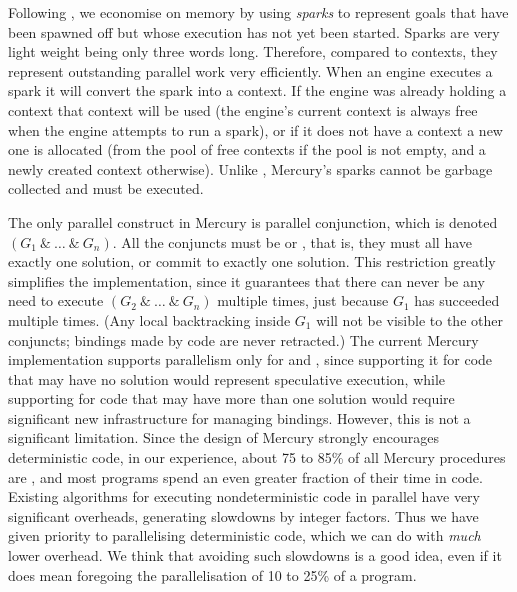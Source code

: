 Following \citet{simonmar_2009_multicore_rts},
we economise on memory by using \emph{sparks}
to represent goals that have been spawned off
but whose execution has not yet been started.
Sparks are very light weight being only three words long.
Therefore, compared to contexts,
they represent outstanding parallel work very efficiently.
When an engine executes a spark it will convert the spark into a context.
If the engine was already holding a context that context will be used
(the engine's current context is always free when the engine attempts to run
a spark),
or if it does not have a context a new one is allocated
(from the pool of free contexts if the pool is not empty,
and a newly created context otherwise).
Unlike \citet{simonmar_2009_multicore_rts},
Mercury's sparks cannot be garbage collected and must be executed.

The only parallel construct in Mercury is parallel conjunction,
which is denoted $(G_1~\&~\ldots~\&~G_n)$.
All the conjuncts must be \ddet or \dccmulti,
that is, they must all have exactly one solution,
or commit to exactly one solution.
This restriction greatly simplifies the implementation,
since it guarantees that there can never be any need
to execute $(G_2~\&~\ldots~\&~G_n)$ multiple times,
just because $G_1$ has succeeded multiple times.
(Any local backtracking inside $G_1$ will not be visible to the other conjuncts;
bindings made by \ddet code are never retracted.)
The current Mercury implementation supports parallelism only for \ddet and \dccmulti,
since supporting it for code that may have no solution
would represent speculative execution,
while supporting for code that may have more than one solution
would require significant new infrastructure for managing bindings.
However, this is not a significant limitation.
Since the design of Mercury strongly encourages deterministic code,
in our experience, about 75 to 85\% of all Mercury procedures are \ddet,
and most programs spend an even greater fraction of their time in \ddet code.
Existing algorithms for executing nondeterministic code in parallel
have very significant overheads, generating slowdowns by integer factors.
Thus we have given priority to parallelising deterministic code,
which we can do with \emph{much} lower overhead.
We think that avoiding such slowdowns is a good idea,
even if it does mean foregoing the parallelisation of 10 to 25\% of a program.

